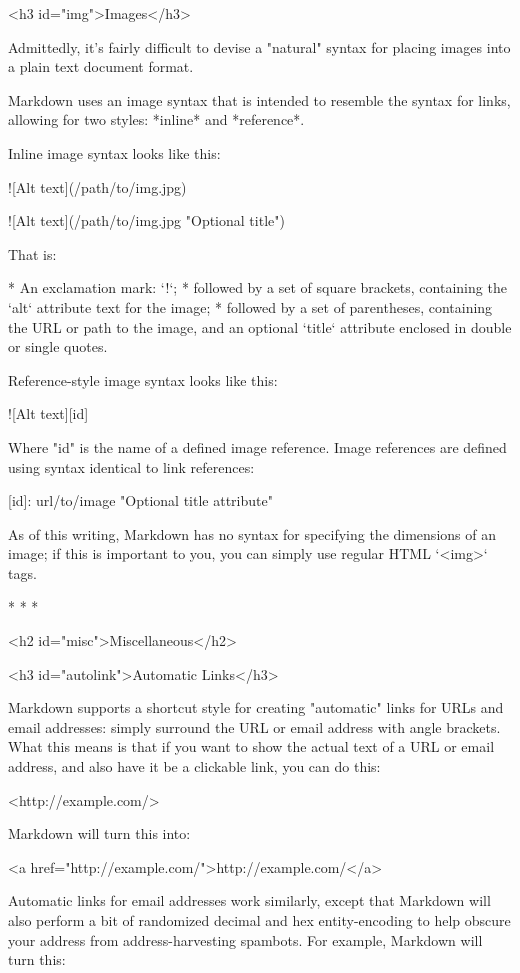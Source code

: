<h3 id="img">Images</h3>

Admittedly, it's fairly difficult to devise a "natural" syntax for
placing images into a plain text document format.

Markdown uses an image syntax that is intended to resemble the syntax
for links, allowing for two styles: *inline* and *reference*.

Inline image syntax looks like this:

    ![Alt text](/path/to/img.jpg)

    ![Alt text](/path/to/img.jpg "Optional title")

That is:

*   An exclamation mark: `!`;
*   followed by a set of square brackets, containing the `alt`
    attribute text for the image;
*   followed by a set of parentheses, containing the URL or path to
    the image, and an optional `title` attribute enclosed in double
    or single quotes.

Reference-style image syntax looks like this:

    ![Alt text][id]

Where "id" is the name of a defined image reference. Image references
are defined using syntax identical to link references:

    [id]: url/to/image  "Optional title attribute"

As of this writing, Markdown has no syntax for specifying the
dimensions of an image; if this is important to you, you can simply
use regular HTML `<img>` tags.


* * *


<h2 id="misc">Miscellaneous</h2>

<h3 id="autolink">Automatic Links</h3>

Markdown supports a shortcut style for creating "automatic" links for URLs and email addresses: simply surround the URL or email address with angle brackets. What this means is that if you want to show the actual text of a URL or email address, and also have it be a clickable link, you can do this:

    <http://example.com/>
    
Markdown will turn this into:

    <a href="http://example.com/">http://example.com/</a>

Automatic links for email addresses work similarly, except that
Markdown will also perform a bit of randomized decimal and hex
entity-encoding to help obscure your address from address-harvesting
spambots. For example, Markdown will turn this:

